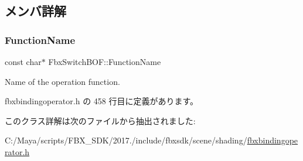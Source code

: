 \subsection{メンバ詳解}
\mbox{\label{class_fbx_switch_b_o_f_a5d39c1526096c35b43cb93759270df40}} 
\subsubsection{\texorpdfstring{Function\+Name}{FunctionName}}
{\footnotesize\ttfamily const char$\ast$ Fbx\+Switch\+B\+O\+F\+::\+Function\+Name\hspace{0.3cm}{\ttfamily [static]}}



Name of the operation function. 



 fbxbindingoperator.\+h の 458 行目に定義があります。



このクラス詳解は次のファイルから抽出されました\+:\begin{DoxyCompactItemize}
\item 
C\+:/\+Maya/scripts/\+F\+B\+X\+\_\+\+S\+D\+K/2017./include/fbxsdk/scene/shading/\hyperlink{fbxbindingoperator_8h}{fbxbindingoperator.\+h}\end{DoxyCompactItemize}
